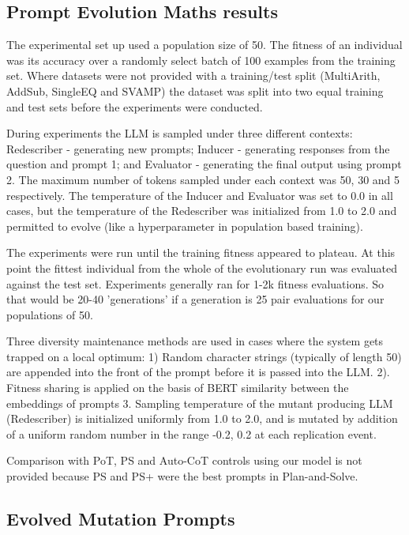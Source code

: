 \documentclass{article} %
\begin{document}
\subsection{Prompt Evolution Maths results} 

The experimental set up used a population size of 50. The fitness of an individual was its accuracy over a randomly select batch of 100 examples from the training set. Where datasets were not provided with a training/test split (MultiArith, AddSub, SingleEQ and SVAMP) the dataset was split into two equal training and test sets before the experiments were conducted.

During experiments the LLM is sampled under three different contexts: Redescriber - generating new prompts; Inducer - generating responses from the question and prompt 1; and Evaluator - generating the final output using prompt 2. The maximum number of tokens sampled under each context was 50, 30 and 5 respectively. The temperature of the Inducer and Evaluator was set to 0.0 in all cases, but the temperature of the Redescriber was initialized from 1.0 to 2.0 and permitted to evolve (like a hyperparameter in population based training). 

The experiments were run until the training fitness appeared to plateau. At this point the fittest individual from the whole of the evolutionary run was evaluated against the test set. Experiments generally ran for 1-2k fitness evaluations. So that would be 20-40 'generations' if a generation is 25 pair evaluations for our populations of 50. 

Three diversity maintenance methods are used in cases where the system gets trapped on a local optimum: 1) Random character strings (typically of length 50) are appended into the front of the prompt before it is passed into the LLM. 2). Fitness sharing is applied on the basis of BERT similarity between the embeddings of prompts \cite{shir2005niching} 3. Sampling temperature of the mutant producing LLM (Redescriber) is initialized uniformly from 1.0 to 2.0, and is mutated by addition of a uniform random number in the range {-0.2, 0.2} at each replication event.

Comparison with PoT, PS and Auto-CoT controls using our model is not provided because PS and PS+ were the best prompts in Plan-and-Solve. 


\lstset{
basicstyle=\small\ttfamily,
columns=flexible,
breaklines=true,
breakindent=0pt,
}

\subsection{Evolved Mutation Prompts}
\end{document}
